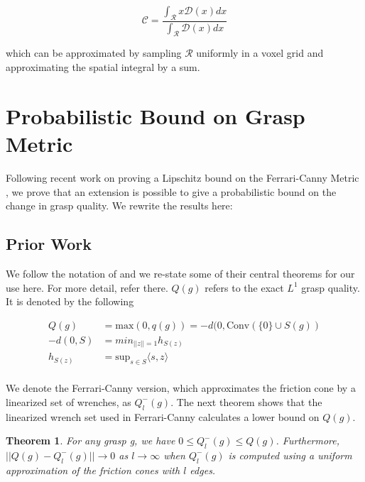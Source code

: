 \documentclass[letterpaper, 10 pt, conference]{ieeeconf}  %
\newtheorem{theorem}{Theorem}
\begin{document}
\begin{equation}
  \mathcal{C} 
  =
  \frac
    {\int_{\mathcal{R}}x \mathcal{D}(x) dx}
    {\int_{\mathcal{R}}  \mathcal{D}(x) dx}
\end{equation}

which can be approximated by sampling $\mathcal{R}$ uniformly in a voxel grid and approximating the spatial integral by a sum.


\section{Probabilistic Bound on Grasp Metric}
Following recent work on proving a Lipschitz bound on the Ferrari-Canny Metric \cite{pokorny2013classical}, we prove that an extension is possible to give a probabilistic bound on the change in grasp quality.
We rewrite the results here:

\subsection{Prior Work}

We follow the notation of \cite{pokorny2013classical} and we re-state some of their central theorems for our use here.
For more detail, refer there.
$Q(g)$ refers to the exact $L^1$ grasp quality.
It is denoted by the following 

\begin{align}
  Q(g) &= \mbox{max}(0,q(g)) = -d(0,\mbox{Conv}(\{0\} \cup S(g))\\
-d(0,S) &= min_{||z|| = 1} h_{S(z)}\\
h_{S(z)} &= \mbox{sup}_{s\in S}\langle s,z\rangle\\
\end{align}

We denote the Ferrari-Canny version, which approximates the friction cone by a linearized set of wrenches\cite{ferrari1992}, as $Q^-_l(g)$.
The next theorem shows that the linearized wrench set used in Ferrari-Canny calculates a lower bound on $Q(g)$.\\

\begin{theorem}
  \cite{pokorny2013classical}
For any grasp g, we have $0 \leq Q_l^-(g) \leq Q(g)$.
Furthermore, $||Q(g) - Q^-_l(g)|| \rightarrow 0$ as $l \rightarrow \infty$ when $Q_l^-(g)$ is computed using a uniform approximation of the friction cones with $l$ edges. \\
\end{theorem}
\end{document}
